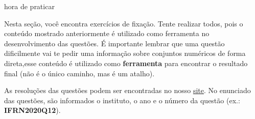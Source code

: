 \documentclass[10pt]{article}
\begin{document}
 \begin{center}
            {\LARGE {\sc hora de praticar}}
        \end{center}

Nesta seção, você encontra exercícios de fixação. Tente realizar todos, pois o conteúdo mostrado anteriormente é utilizado como ferramenta no desenvolvimento das questões. É importante lembrar que uma questão dificilmente vai te pedir uma informação sobre conjuntos numéricos de forma direta,esse conteúdo é utilizado como \textbf{ferramenta} para encontrar o resultado final (não é o único caminho, mas é um atalho).

As resoluções das questões podem ser encontradas no nosso \href{https://prepif.herokuapp.com/instituicoes}{site}. No enunciado das questões, são informados o instituto, o ano e o número da questão (ex.: \textbf{IFRN2020Q12}).
\end{document}
